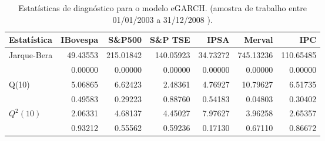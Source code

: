 \begin{table}[H]
\centering
\caption{Estatísticas de diagnóstico para o modelo eGARCH. 
               (amostra de trabalho entre 01/01/2003 a 31/12/2008 ).} 
\label{tab:garchstats}
\begin{tabular}{lrrrrrr}
  \hline
Estatística & IBovespa & S\&P500 & S\&P TSE & IPSA & Merval & IPC \\ 
  \hline
Jarque-Bera & 49.43553 & 215.01842 & 140.05923 & 34.73272 & 745.13236 & 110.65485 \\ 
   & 0.00000 & 0.00000 & 0.00000 & 0.00000 & 0.00000 & 0.00000 \\ 
  Q(10) & 5.06865 & 6.62423 & 2.48361 & 4.76927 & 10.79627 & 6.51735 \\ 
   & 0.49583 & 0.29223 & 0.88760 & 0.54183 & 0.04803 & 0.30402 \\ 
  $Q^2(10)$ & 2.06331 & 4.68137 & 4.45027 & 7.97627 & 3.96258 & 2.65357 \\ 
   & 0.93212 & 0.55562 & 0.59236 & 0.17130 & 0.67110 & 0.86672 \\ 
   \hline
\end{tabular}
\end{table}
